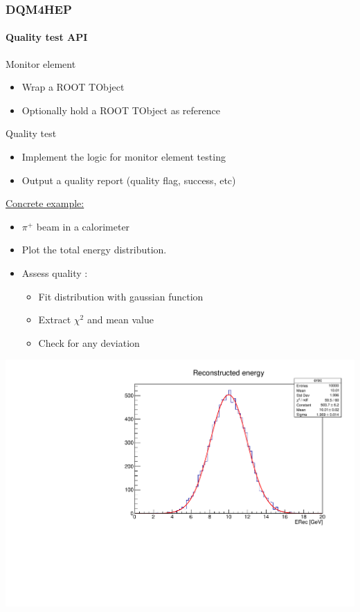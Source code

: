 \documentclass[presentation, 10pt]{beamer}
\begin{document}
\begin{frame}
  \frametitle{DQM4HEP}
  \framesubtitle{Quality test API}
  \footnotesize
  \begin{block}{\footnotesize Monitor element}
    \begin{itemize}
      \item Wrap a ROOT TObject 
      \item Optionally hold a ROOT TObject as reference
    \end{itemize}
  \end{block}
  \begin{block}{\footnotesize Quality test}
    \begin{itemize}
      \item Implement the logic for monitor element testing
      \item Output a quality report (quality flag, success, etc)
    \end{itemize}
  \end{block}
  \pause
  \underline{Concrete example:} \\
  \begin{minipage}{0.38\linewidth}
    \begin{itemize}
      \scriptsize
      \item $\pi^+$ beam in a calorimeter
      \item Plot the total energy distribution. %
      \item Assess quality :
      \begin{itemize}
        \scriptsize
        \item Fit distribution with gaussian function
        \item Extract $\chi^2$ and mean value
        \item Check for any deviation
      \end{itemize}
    \end{itemize}
  \end{minipage}
  \begin{minipage}{0.3\linewidth}
    \centering
    \includegraphics[width=\linewidth]{figs/ERecExample.pdf} \\

\end{minipage}
\end{frame}
\end{document}
